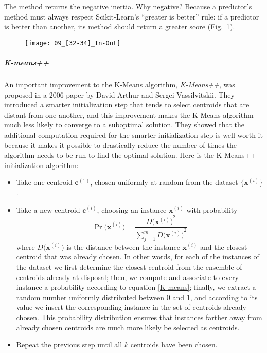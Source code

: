 The  method returns the negative inertia. Why negative? Because a predictor's  method must always respect Scikit-Learn's ``greater is better'' rule: if a predictor is better than another, its  method should return a greater score (Fig.~\ref{09_[32-34]_In-Out}).
\begin{figure}[h!t]
\centering
\texttt{[image: 09\_[32-34]\_In-Out]}
\caption{}\label{09_[32-34]_In-Out}
\end{figure}
\subparagraph{K-means++}
An important improvement to the K-Means algorithm, \emph{K-Means++}, was proposed in a 2006 paper by David Arthur and Sergei Vassilvitskii. They introduced a smarter initialization step that tends to select centroids that are distant from one another, and this improvement makes the K-Means algorithm much less likely to converge to a suboptimal solution. They showed that the additional computation required for the smarter initialization step is well worth it because it makes it possible to drastically reduce the number of times the algorithm needs to be run to find the optimal solution. Here is the K-Means++ initialization algorithm:
\begin{itemize}
\item Take one centroid $\mathbf{c}^{(1)}$, chosen uniformly at random from the dataset $\{\mathbf{x}^{(i)}\}$.
\item Take a new centroid $\mathbf{c}^{(i)}$, choosing an instance $\mathbf{x}^{(i)}$ with probability
\begin{equation}\label{K-means}
\operatorname{Pr}\bigl(\mathbf{x}^{(i)}\bigr)=\frac{{D\bigl(\mathbf{x}^{(i)}\bigr)}^2}{\sum_{j=1}^m{D\bigl(\mathbf{x}^{(i)}\bigr)}^2}
\end{equation}
where $D\bigl(\mathbf{x}^{(i)}\bigr)$ is the distance between the instance $\mathbf{x}^{(i)}$ and the closest centroid that was already chosen. In other words, for each of the instances of the dataset we first determine the closest centroid from the ensemble of centroids already at disposal; then, we compute and associate to every instance a probability according to equation \eqref{K-means}; finally, we extract a random number uniformly distributed between 0 and 1, and according to its value we insert the corresponding instance in the set of centroids already chosen. This probability distribution ensures that instances farther away from already chosen centroids are much more likely be selected as centroids.
\item Repeat the previous step until all $k$ centroids have been chosen.
\end{itemize}
